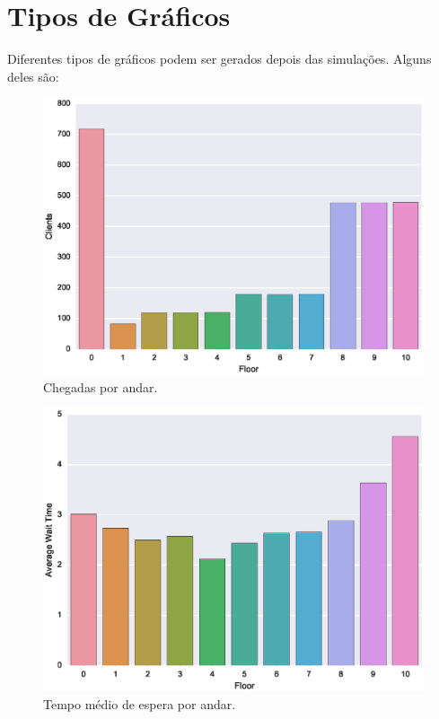 \chapter{Tipos de Gráficos} \label{app:chart}

Diferentes tipos de gráficos podem ser gerados depois das simulações. Alguns deles são:

\begin{figure}[htb!]
  \centering
  \includegraphics[scale=0.6]{img/results/Low-rise/5_Planning_Random/arrivalsPerFloor.eps}
  \caption{Chegadas por andar.}
  \label{fig:graphs:arrivalsperfloor}
\end{figure}

\begin{figure}[htb!]
  \centering
  \includegraphics[scale=0.6]{img/results/Low-rise/5_Planning_Random/averageWaitTime.eps}
  \caption{Tempo médio de espera por andar.}
  \label{fig:graphs:averagewaittime}
\end{figure}

